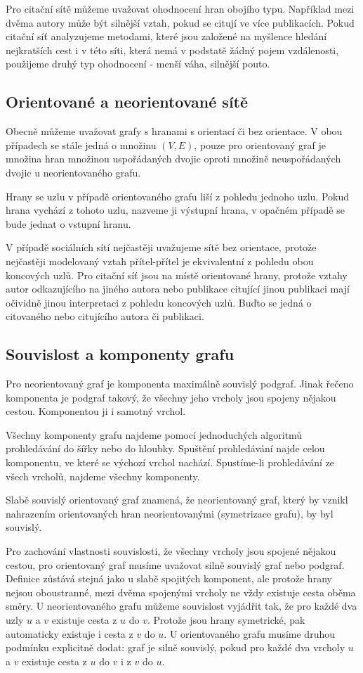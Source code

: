 \documentclass[12pt,titlepage]{report}
\begin{document}
Pro citační sítě můžeme uvažovat ohodnocení hran obojího typu. Například mezi
dvěma autory může být silnější vztah, pokud se citují ve více publikacích.
Pokud citační síť analyzujeme metodami, které jsou založené na myšlence hledání
nejkratších cest i v této síti, která nemá v podstatě žádný pojem vzdálenosti,
použijeme druhý typ ohodnocení - menší váha, silnější pouto.


\subsection{Orientované a neorientované sítě}
Obecně můžeme uvažovat grafy s hranami s orientací či bez orientace. V obou
případech se stále jedná o množinu $(V, E)$, pouze pro orientovaný graf je
množina hran množinou uspořádaných dvojic oproti množině neuspořádaných dvojic
u neorientovaného grafu.

Hrany se uzlu v případě orientovaného grafu liší z pohledu jednoho uzlu. Pokud
hrana vychází z tohoto uzlu, nazveme ji výstupní hrana, v opačném případě se
bude jednat o vstupní hranu.

V případě sociálních sítí nejčastěji uvažujeme sítě bez orientace, protože
nejčastěji modelovaný vztah přítel-přítel je ekvivalentní z pohledu obou
koncových uzlů. Pro citační síť jsou na místě orientované hrany, protože vztahy
autor odkazujícího na jiného autora nebo publikace citující jinou publikaci
mají očividně jinou interpretaci z pohledu koncových uzlů. Buďto se jedná o
citovaného nebo citujícího autora či publikaci.

\subsection{Souvislost a komponenty grafu}
Pro neorientovaný graf je komponenta maximálně souvislý podgraf. Jinak řečeno
komponenta je podgraf takový, že všechny jeho vrcholy jsou spojeny nějakou
cestou. Komponentou ji i samotný vrchol.

Všechny komponenty grafu najdeme pomocí jednoduchých algoritmů prohledávání do
šířky nebo do hloubky. Spuštění prohledávání najde celou komponentu, ve které
se výchozí vrchol nachází. Spustíme-li prohledávání ze všech vrcholů, najdeme
všechny komponenty. 

Slabě souvislý orientovaný graf znamená, že neorientovaný graf, který by vznikl
nahrazením orientovaných hran neorientovanými (symetrizace grafu), by byl
souvislý.

Pro zachování vlastnosti souvislosti, že všechny vrcholy jsou spojené nějakou
cestou, pro orientovaný graf musíme uvažovat silně souvislý graf nebo podgraf.
Definice zůstává stejná jako u slabě spojitých komponent, ale protože hrany
nejsou oboustranné, mezi dvěma spojenými vrcholy ne vždy existuje cesta oběma
směry. U neorientovaného grafu můžeme souvislost vyjádřit tak, že pro každé dva
uzly $u$ a $v$ existuje cesta z $u$ do $v$. Protože jsou hrany symetrické, pak
automaticky existuje i cesta z $v$ do $u$. U orientovaného grafu musíme druhou
podmínku explicitně dodat: graf je silně souvislý, pokud pro každé dva vrcholy
$u$ a $v$ existuje cesta z $u$ do $v$ i z $v$ do $u$. 
\end{document}
